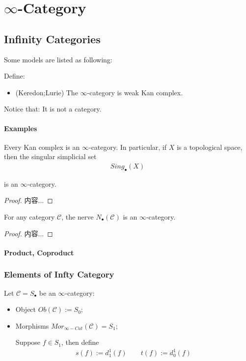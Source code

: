 \documentclass[Total.tex]{subfiles}
\begin{document}
	\chapter{$\infty$-Category}
		\section{Infinity Categories}
			Some models are listed as following:
			\begin{Def}
				Define:
				\begin{itemize}
					\item (Keredon;Lurie) The $\infty$-category is weak Kan complex.
					
				\end{itemize}
				
				Notice that: It is not a category.
			\end{Def}
			\subsubsection{Examples}
			\begin{proposition}
				Every Kan complex is an $\infty$-category. In particular, if $X$ is a topological space, then the singular simplicial set
				\begin{gather*}
					Sing_\bullet(X)
				\end{gather*}
				
				is an $\infty$-category.
			\end{proposition}
			\begin{proof}
				内容...
			\end{proof}
			
			\begin{proposition}
				For any category $\mathcal{C}$, the nerve $N_\bullet(\mathcal{C})$ is an $\infty$-category.
			\end{proposition}
			\begin{proof}
				内容...
			\end{proof}
			\subsubsection{Product, Coproduct}
			
			\subsection{Elements of Infty Category}
			\begin{Def}
				Let $\mathcal{C}=S_\bullet$ be an $\infty$-category:
				\begin{itemize}
					\item Object $Ob(\mathcal{C}):=S_0$;
					\item Morphisms $Mor_{\infty-Cat}(\mathcal{C})=S_1$;
					
					Suppose $f\in S_1$, then define
					\begin{gather*}
						s(f):=d^1_1(f)\qquad t(f):=d^1_0(f)
					\end{gather*}
				\end{itemize}
				
			\end{Def}
			
\end{document}

